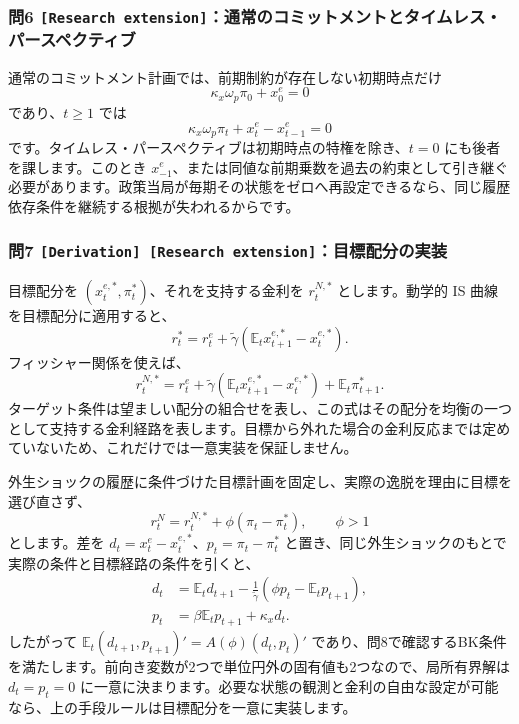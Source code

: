 \documentclass[
  japanese,
  lualatex,
  ja=standard,
  11pt,
  a4paper]{ltjsarticle}
\begin{document}
\subsubsection{\texorpdfstring{問6
\texttt{{[}Research\ extension{]}}：通常のコミットメントとタイムレス・パースペクティブ}{問6 {[}Research extension{]}：通常のコミットメントとタイムレス・パースペクティブ}}\label{ux554f6-research-extensionux901aux5e38ux306eux30b3ux30dfux30c3ux30c8ux30e1ux30f3ux30c8ux3068ux30bfux30a4ux30e0ux30ecux30b9ux30d1ux30fcux30b9ux30daux30afux30c6ux30a3ux30d6}

通常のコミットメント計画では、前期制約が存在しない初期時点だけ \[
\kappa_x\omega_p\pi_0+x_0^e=0
\] であり、\(t\geq1\) では \[
\kappa_x\omega_p\pi_t+x_t^e-x_{t-1}^e=0
\] です。タイムレス・パースペクティブは初期時点の特権を除き、\(t=0\)
にも後者を課します。このとき
\(x_{-1}^e\)、または同値な前期乗数を過去の約束として引き継ぐ必要があります。政策当局が毎期その状態をゼロへ再設定できるなら、同じ履歴依存条件を継続する根拠が失われるからです。

\subsubsection{\texorpdfstring{問7
\texttt{{[}Derivation{]}\ {[}Research\ extension{]}}：目標配分の実装}{問7 {[}Derivation{]} {[}Research extension{]}：目標配分の実装}}\label{ux554f7-derivation-research-extensionux76eeux6a19ux914dux5206ux306eux5b9fux88c5}

目標配分を \((x_t^{e,*},\pi_t^*)\)、それを支持する金利を \(r_t^{N,*}\)
とします。動学的 IS 曲線を目標配分に適用すると、 \[
r_t^*=r_t^e+\widetilde\gamma
\left(\mathbb E_tx_{t+1}^{e,*}-x_t^{e,*}\right).
\] フィッシャー関係を使えば、 \[
r_t^{N,*}
=r_t^e+\widetilde\gamma
\left(\mathbb E_tx_{t+1}^{e,*}-x_t^{e,*}\right)
+\mathbb E_t\pi_{t+1}^*.
\]
ターゲット条件は望ましい配分の組合せを表し、この式はその配分を均衡の一つとして支持する金利経路を表します。目標から外れた場合の金利反応までは定めていないため、これだけでは一意実装を保証しません。

外生ショックの履歴に条件づけた目標計画を固定し、実際の逸脱を理由に目標を選び直さず、
\[
r_t^N=r_t^{N,*}+\phi(\pi_t-\pi_t^*),
\qquad\phi>1
\] とします。差を \(d_t=x_t^e-x_t^{e,*}\)、\(p_t=\pi_t-\pi_t^*\)
と置き、同じ外生ショックのもとで実際の条件と目標経路の条件を引くと、 \[
\begin{aligned}
d_t&=\mathbb E_td_{t+1}
-\frac1{\widetilde\gamma}
\left(\phi p_t-\mathbb E_tp_{t+1}\right),\\
p_t&=\beta\mathbb E_tp_{t+1}+\kappa_xd_t.
\end{aligned}
\] したがって \(\mathbb E_t(d_{t+1},p_{t+1})'=A(\phi)(d_t,p_t)'\)
であり、問8で確認するBK条件を満たします。前向き変数が2つで単位円外の固有値も2つなので、局所有界解は
\(d_t=p_t=0\)
に一意に決まります。必要な状態の観測と金利の自由な設定が可能なら、上の手段ルールは目標配分を一意に実装します。
\end{document}
